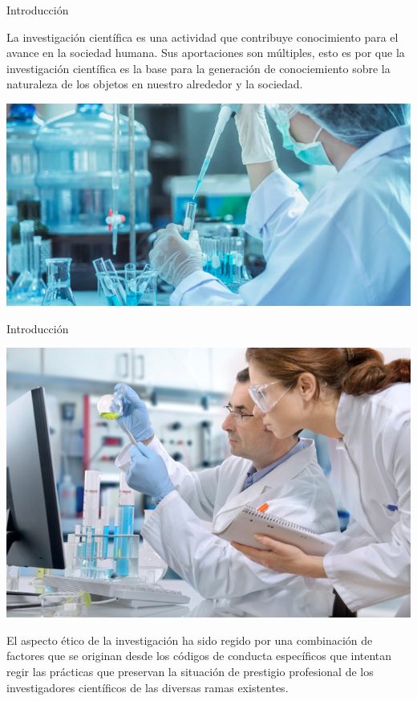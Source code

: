 \begin{frame}{Introducción}
    \begin{minipage}{0.4\linewidth}
    La investigación científica es una actividad que contribuye conocimiento para el avance en la sociedad humana. Sus aportaciones
son múltiples, esto es por que la investigación científica es la base para la generación de conociemiento sobre la naturaleza de los objetos en nuestro
alrededor y la sociedad.
    \end{minipage}
    \hspace{0.4cm}
    \begin{minipage}{0.45\linewidth}
        \centering
        \includegraphics[scale=1.2]{images/ima1.jpg}
    \end{minipage}
\end{frame}
\begin{frame}{Introducción}
    \begin{minipage}{0.45\linewidth}    
        \centering
        \includegraphics[scale=0.22]{images/ima2.jpg}
    \end{minipage}
    \hspace{0.4cm}
    \begin{minipage}{0.45\linewidth}
        El aspecto ético de la investigación ha sido regido por una combinación de factores que se originan desde los códigos de conducta específicos 
que intentan regir las prácticas que preservan la situación de prestigio profesional de los investigadores científicos de las diversas ramas existentes.
    \end{minipage}
\end{frame}

